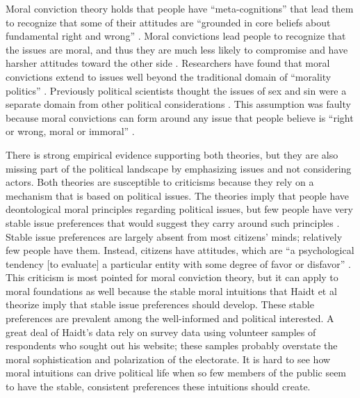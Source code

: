 Moral conviction theory holds that people have ``meta-cognitions'' that lead them to recognize that some of their attitudes are ``grounded in core beliefs about fundamental right and wrong'' \cite[96]{SkitkaMorgan2014}. Moral convictions lead people to recognize that the issues are moral, and thus they are much less likely to compromise and have harsher attitudes toward the other side \cite{SkitkaWisneski2011}. Researchers have found that moral convictions extend to issues well beyond the traditional domain of ``morality politics'' \cite{Ryan2014}. Previously political scientists thought the issues of sex and sin were a separate domain from other political considerations \cite{Mooney2001}. This assumption was faulty because moral convictions can form around any issue that people believe is ``right or wrong, moral or immoral'' \cite{SkitkaBauman2008}.

There is strong empirical evidence supporting both theories, but they are also missing part of the political landscape by emphasizing issues and not considering actors. Both theories are susceptible to criticisms because they rely on a mechanism that is based on political issues. The theories imply that people have deontological moral principles regarding political issues, but few people have very stable issue preferences that would suggest they carry around such principles \cite{Bartels2003}. Stable issue preferences are largely absent from most citizens' minds; relatively few people have them. Instead, citizens have attitudes, which are ``a psychological tendency [to evaluate] a particular entity with some degree of favor or disfavor'' \cite[52]{Bartels2003}. This criticism is most pointed for moral conviction theory, but it can apply to moral foundations as well because the stable moral intuitions that Haidt et al theorize imply that stable issue preferences should develop. These stable preferences are prevalent among the well-informed and political interested. A great deal of Haidt's data rely on survey data using volunteer samples of respondents who sought out his website; these samples probably overstate the moral sophistication and polarization of the electorate. It is hard to see how moral intuitions can drive political life when so few members of the public seem to have the stable, consistent preferences these intuitions should create.

